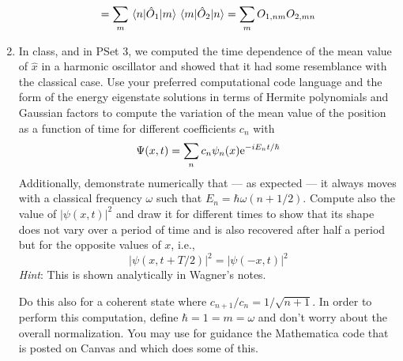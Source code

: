 \documentclass[../psets.tex]{subfiles}
\begin{document}
\begin{enumerate}
\begin{equation}
        = \sum_m\mel{n}{\hat{O}_1}{m}\mel{m}{\hat{O}_2}{n}
        = \sum_mO_{1,nm}O_{2,mn}
    \end{equation}
    \item In class, and in PSet 3, we computed the time dependence of the mean value of $\hat{x}$ in a harmonic oscillator and showed that it had some resemblance with the classical case. Use your preferred computational code language and the form of the energy eigenstate solutions in terms of Hermite polynomials and Gaussian factors to compute the variation of the mean value of the position as a function of time for different coefficients $c_n$ with
    \begin{equation}
        \Psi(x,t) = \sum_nc_n\psi_n(x)\e[-iE_nt/\hbar]
    \end{equation}
    Additionally, demonstrate numerically that --- as expected --- it always moves with a classical frequency $\omega$ such that $E_n=\hbar\omega(n+1/2)$. Compute also the value of $|\psi(x,t)|^2$ and draw it for different times to show that its shape does not vary over a period of time and is also recovered after half a period but for the opposite values of $x$, i.e.,
    \begin{equation}
        |\psi(x,t+T/2)|^2 = |\psi(-x,t)|^2
    \end{equation}
    \emph{Hint}: This is shown analytically in Wagner's notes.\par
    Do this also for a coherent state where $c_{n+1}/c_n=1/\sqrt{n+1}$. In order to perform this computation, define $\hbar=1=m=\omega$ and don't worry about the overall normalization. You may use for guidance the Mathematica code that is posted on Canvas and which does some of this.
\end{enumerate}
\end{document}
